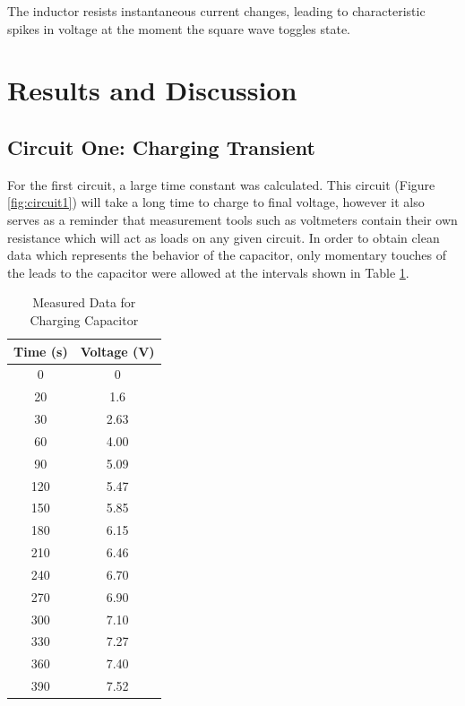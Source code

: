 \documentclass[12pt]{article}
\begin{document}
The inductor resists instantaneous current changes, leading to characteristic spikes in voltage at the moment the square wave toggles state.
\section{Results and Discussion}
\subsection{Circuit One: Charging Transient}
For the first circuit, a large time constant was calculated. This circuit
(Figure \ref{fig:circuit1}) will take a long time to charge to final voltage,
however it also serves as a reminder that measurement tools such as voltmeters
contain their own resistance which will act as loads on any given circuit. In
order to obtain clean data which represents the behavior of the capacitor,
only momentary touches of the leads to the capacitor were allowed at the
intervals shown in Table \ref{tab:charging}.

\begin{table}[H]
	\centering
	\begin{tabular}{|c|c|}
		\hline
		Time (s) & Voltage (V) \\
		\hline
		0        & 0           \\
		\hline
		20       & 1.6         \\
		\hline
		30       & 2.63        \\
		\hline
		60       & 4.00        \\
		\hline
		90       & 5.09        \\
		\hline
		120      & 5.47        \\
		\hline
		150      & 5.85        \\
		\hline
		180      & 6.15        \\
		\hline
		210      & 6.46        \\
		\hline
		240      & 6.70        \\
		\hline
		270      & 6.90        \\
		\hline
		300      & 7.10        \\
		\hline
		330      & 7.27        \\
		\hline
		360      & 7.40        \\
		\hline
		390      & 7.52        \\
		\hline
	\end{tabular}
	\caption{Measured Data for Charging Capacitor}
	\label{tab:charging}
\end{table}
\end{document}
